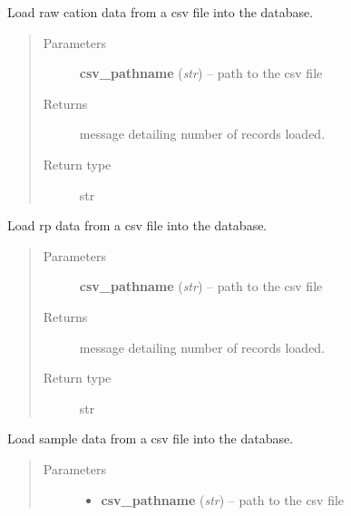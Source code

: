\documentclass[letterpaper,10pt,english]{sphinxmanual}
\begin{document}
\begin{fulllineitems}
\begin{fulllineitems}
\label{modules:webb_utils.upload_data.UploadData.load_raw_cation_data}
Load raw cation data from a csv file into the database.
\begin{quote}\begin{description}
\item[{Parameters}] \leavevmode
\textbf{csv\_pathname} (\emph{str}) -- path to the csv file

\item[{Returns}] \leavevmode
message detailing number of records loaded.

\item[{Return type}] \leavevmode
str

\end{description}\end{quote}

\end{fulllineitems}


\begin{fulllineitems}
\label{modules:webb_utils.upload_data.UploadData.load_rp_desc_data}
Load rp data from a csv file into the database.
\begin{quote}\begin{description}
\item[{Parameters}] \leavevmode
\textbf{csv\_pathname} (\emph{str}) -- path to the csv file

\item[{Returns}] \leavevmode
message detailing number of records loaded.

\item[{Return type}] \leavevmode
str

\end{description}\end{quote}

\end{fulllineitems}


\begin{fulllineitems}
\label{modules:webb_utils.upload_data.UploadData.load_sample_data}
Load sample data from a csv file into the database.
\begin{quote}\begin{description}
\item[{Parameters}] \leavevmode\begin{itemize}
\item {} 
\textbf{csv\_pathname} (\emph{str}) -- path to the csv file


\end{itemize}
\end{description}
\end{quote}
\end{fulllineitems}
\end{fulllineitems}
\end{document}
